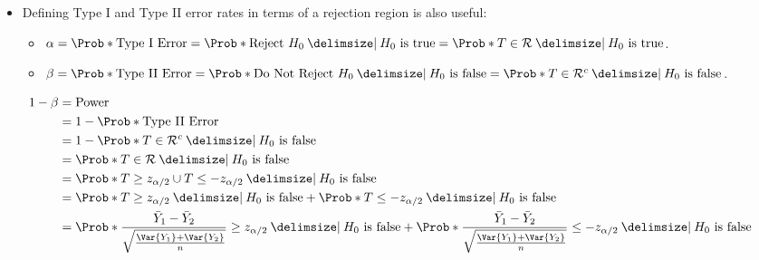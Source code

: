 \begin{itemize}
      \item Defining Type I and Type II error rates in terms of a rejection region is also useful:
            \begin{itemize}
                  \item $ \alpha=\Prob*{\text{Type I Error}}=\Prob*{\text{Reject $ H_0 $}\given \text{$ H_0 $ is true}}=\Prob*{T\in\mathcal{R}\given \text{$ H_0 $ is true}} $.
                  \item $ \beta=\Prob*{\text{Type II Error}}=\Prob*{\text{Do Not Reject $ H_0 $}\given \text{$ H_0 $ is false}}=\Prob*{T\in\mathcal{R}^c\given \text{$ H_0 $ is false}} $.
            \end{itemize}
\end{itemize}
\begin{align*}
      1-\beta
       & =\text{Power}                                                                                                                                                                                                                                   \\
       & =1-\Prob*{\text{Type II Error}}                                                                                                                                                                                                                 \\
       & =1-\Prob*{T\in\mathcal{R}^c\given \text{$ H_0 $ is false}}                                                                                                                                                                                      \\
       & =\Prob*{T\in\mathcal{R}\given \text{$ H_0 $ is false}}                                                                                                                                                                                          \\
       & =\Prob*{T\ge z_{\alpha/2}\cup T\le -z_{\alpha/2}\given \text{$ H_0 $ is false}}                                                                                                                                                                 \\
       & =\Prob*{T\ge z_{\alpha/2}\given \text{$ H_0 $ is false}}+\Prob*{T\le -z_{\alpha/2}\given \text{$ H_0 $ is false}}                                                                                                                               \\
       & =\Prob*{\frac{\bar{Y}_1-\bar{Y}_2}{\sqrt{\frac{\Var{Y_1}+\Var{Y_2}}{n}}}\ge z_{\alpha/2}\given \text{$ H_0 $ is false}}+\Prob*{\frac{\bar{Y}_1-\bar{Y}_2}{\sqrt{\frac{\Var{Y_1}+\Var{Y_2}}{n}}}\le -z_{\alpha/2}\given \text{$ H_0 $ is false}}
\end{align*}
